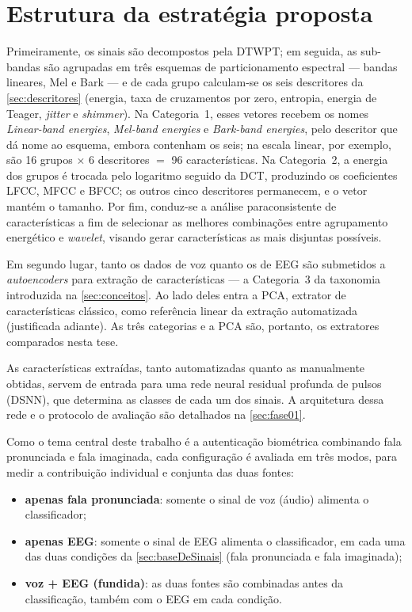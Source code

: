 	\section{Estrutura da estratégia proposta}
		\label{sec:estruturaDaEstrategiaProposta}
		
		\par Primeiramente, os sinais são decompostos pela \ac{DTWPT}; em seguida, as sub-bandas são agrupadas em três esquemas de particionamento espectral --- bandas lineares, Mel e Bark --- e de cada grupo calculam-se os seis descritores da \autoref{sec:descritores} (energia, taxa de cruzamentos por zero, entropia, energia de Teager, \textit{jitter} e \textit{shimmer}). Na Categoria~1, esses vetores recebem os nomes \textit{Linear-band energies}, \textit{Mel-band energies} e \textit{Bark-band energies}, pelo descritor que dá nome ao esquema, embora contenham os seis; na escala linear, por exemplo, são 16 grupos $\times$ 6 descritores $=$ 96 características. Na Categoria~2, a energia dos grupos é trocada pelo logaritmo seguido da \ac{DCT}, produzindo os coeficientes \ac{LFCC}, \ac{MFCC} e \ac{BFCC}; os outros cinco descritores permanecem, e o vetor mantém o tamanho. Por fim, conduz-se a análise paraconsistente de características a fim de selecionar as melhores combinações entre agrupamento energético e \textit{wavelet}, visando gerar características as mais disjuntas possíveis.

		\par Em segundo lugar, tanto os dados de voz quanto os de EEG são submetidos a \textit{autoencoders} para extração de características --- a Categoria~3 da taxonomia introduzida na \autoref{sec:conceitos}. Ao lado deles entra a \ac{PCA}, extrator de características clássico, como referência linear da extração automatizada (justificada adiante). As três categorias e a \ac{PCA} são, portanto, os extratores comparados nesta tese.

		\par As características extraídas, tanto automatizadas quanto as manualmente obtidas, servem de entrada para uma rede neural residual profunda de pulsos (\ac{DSNN}), que determina as classes de cada um dos sinais. A arquitetura dessa rede e o protocolo de avaliação são detalhados na \autoref{sec:fase01}.

		\par Como o tema central deste trabalho é a autenticação biométrica combinando fala pronunciada e fala imaginada, cada configuração é avaliada em três modos, para medir a contribuição individual e conjunta das duas fontes:
		\begin{itemize}
			\item \textbf{apenas fala pronunciada}: somente o sinal de voz (áudio) alimenta o classificador;
			\item \textbf{apenas \ac{EEG}}: somente o sinal de EEG alimenta o classificador, em cada uma das duas condições da \autoref{sec:baseDeSinais} (fala pronunciada e fala imaginada);
			\item \textbf{voz + \ac{EEG} (fundida)}: as duas fontes são combinadas antes da classificação, também com o \ac{EEG} em cada condição.
		\end{itemize}

